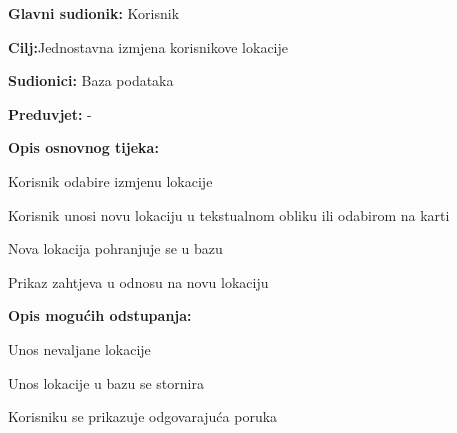 				
					\noindent {}
					\begin{packed_item}
						
						\item \textbf{Glavni sudionik: }Korisnik
						\item  \textbf{Cilj:}Jednostavna izmjena korisnikove lokacije
						\item  \textbf{Sudionici:} Baza podataka
						\item  \textbf{Preduvjet:} -
						\item  \textbf{Opis osnovnog tijeka:}
						
						\item[] \begin{packed_enum}
							
							\item Korisnik odabire izmjenu lokacije
							\item Korisnik unosi novu lokaciju u tekstualnom obliku ili odabirom na karti
							\item Nova lokacija pohranjuje se u bazu
							\item Prikaz zahtjeva u odnosu na novu lokaciju
						\end{packed_enum}
						
						\item  \textbf{Opis mogućih odstupanja:}
						
						\item[] \begin{packed_item}
							
							\item[3.a] Unos nevaljane lokacije
							\item[] \begin{packed_enum}
								
								\item Unos lokacije u bazu se stornira
								\item Korisniku se prikazuje odgovarajuća poruka
								
							\end{packed_enum}

						\end{packed_item}
					\end{packed_item}
				
